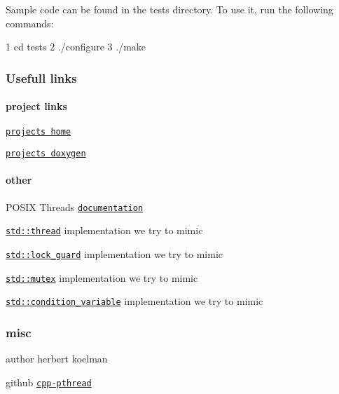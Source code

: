 Sample code can be found in the {\ttfamily tests} directory. To use it, run the following commands\+: 
\begin{DoxyCode}
1 cd tests
2 ./configure
3 ./make
\end{DoxyCode}


\subsubsection*{Usefull links}

\paragraph*{project links}


\begin{DoxyItemize}
\item \href{https://github.com/HerbertKoelman/cpp-pthread}{\tt project\textquotesingle{}s home}
\item \href{http://herbertkoelman.github.io/cpp-pthread/doc/html/}{\tt project\textquotesingle{}s doxygen}
\end{DoxyItemize}

\paragraph*{other}


\begin{DoxyItemize}
\item P\+O\+S\+IX Threads \href{http://pubs.opengroup.org/onlinepubs/007908799/xsh/threads.html}{\tt documentation}
\item \href{http://en.cppreference.com/w/cpp/thread/thread}{\tt std\+::thread} implementation we try to mimic
\item \href{http://en.cppreference.com/w/cpp/thread/lock_guard/lock_guard}{\tt std\+::lock\+\_\+guard} implementation we try to mimic
\item \href{http://en.cppreference.com/w/cpp/thread/mutex}{\tt std\+::mutex} implementation we try to mimic
\item \href{http://en.cppreference.com/w/cpp/thread/condition_variable}{\tt std\+::condition\+\_\+variable} implementation we try to mimic
\end{DoxyItemize}

\subsubsection*{misc}


\begin{DoxyItemize}
\item author herbert koelman
\item github \href{https://github.com/HerbertKoelman/cpp-pthread}{\tt cpp-\/pthread} 
\end{DoxyItemize}